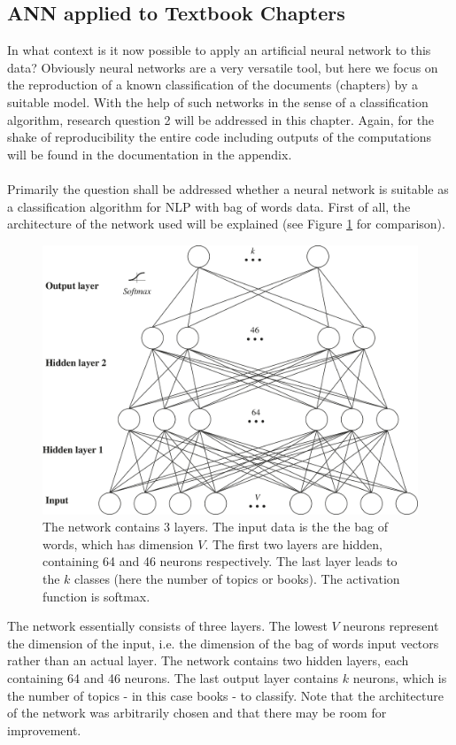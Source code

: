 \documentclass[11pt,a4paper]{article}
\begin{document}
\subsection{ANN applied to Textbook Chapters} \label{sec:ANN.example}

In what context is it now possible to apply an artificial neural network to this data? Obviously neural networks are a very versatile tool, but here we focus on the reproduction of a known classification of the documents (chapters) by a suitable model. With the help of such networks in the sense of a classification algorithm, research question 2 will be addressed in this chapter. Again, for the shake of reproducibility the entire code including outputs of the computations will be found in the documentation in the appendix.\\
\ \\
Primarily the question shall be addressed whether a neural network is suitable as a classification algorithm for NLP with bag of words data. First of all, the architecture of the network used will be explained (see Figure \ref{fig:network_structure} for comparison).
\begin{figure}[h]
	\centering\includegraphics[width=1\textwidth]{network_structure.pdf}
	\caption{The network contains 3 layers. The input data is the the bag of words, which has dimension $V$. The first two layers are hidden, containing 64 and 46 neurons respectively. The last layer leads to the $k$ classes (here the number of topics or books). The activation function is softmax.}
	\label{fig:network_structure}
\end{figure}
The network essentially consists of three layers. The lowest $V$ neurons represent the dimension of the input, i.e. the dimension of the bag of words input vectors rather than an actual layer. The network contains two hidden layers, each containing 64 and 46 neurons. The last output layer contains $k$ neurons, which is the number of topics - in this case books - to classify. Note that the architecture of the network was arbitrarily chosen and that there may be room for improvement.\\
\end{document}
